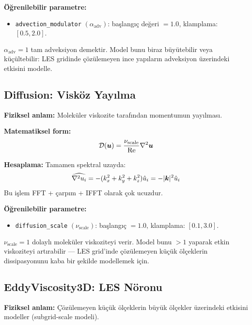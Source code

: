 \textbf{Öğrenilebilir parametre:}
\begin{itemize}
    \item \texttt{advection\_modulator} $(\alpha_{\text{adv}})$: başlangıç değeri $= 1.0$, klamplama: $[0.5, 2.0]$.
\end{itemize}
$\alpha_{\text{adv}} = 1$ tam adveksiyon demektir. Model bunu biraz büyütebilir veya küçültebilir: LES gridinde çözülemeyen ince yapıların adveksiyon üzerindeki etkisini modelle.


\subsection{Diffusion: Visköz Yayılma}
\label{sec:diffusion_noron}

\textbf{Fiziksel anlam:} Moleküler viskozite tarafından momentumun yayılması.

\textbf{Matematiksel form:}
\begin{equation}
    \mathcal{D}(\bm{u}) = \frac{\nu_{\text{scale}}}{\mathrm{Re}} \nabla^2 \bm{u}
    \label{eq:diffusion_neuron}
\end{equation}

\textbf{Hesaplama:} Tamamen spektral uzayda:
\begin{equation}
    \widehat{\nabla^2 u_i} = -(k_x^2 + k_y^2 + k_z^2) \hat{u}_i = -|\bm{k}|^2 \hat{u}_i
    \label{eq:spectral_laplacian}
\end{equation}
Bu işlem FFT + çarpım + IFFT olarak çok ucuzdur.

\textbf{Öğrenilebilir parametre:}
\begin{itemize}
    \item \texttt{diffusion\_scale} $(\nu_{\text{scale}})$: başlangıç $= 1.0$, klamplama: $[0.1, 3.0]$.
\end{itemize}
$\nu_{\text{scale}} = 1$ dolaylı moleküler viskoziteyi verir. Model bunu $> 1$ yaparak etkin viskoziteyi artırabilir --- LES grid'inde çözülemeyen küçük ölçeklerin dissipasyonunu kaba bir şekilde modellemek için.


\subsection{EddyViscosity3D: LES Nöronu}
\label{sec:eddy_noron}

\textbf{Fiziksel anlam:} Çözülemeyen küçük ölçeklerin büyük ölçekler üzerindeki etkisini modeller (subgrid-scale modeli).

